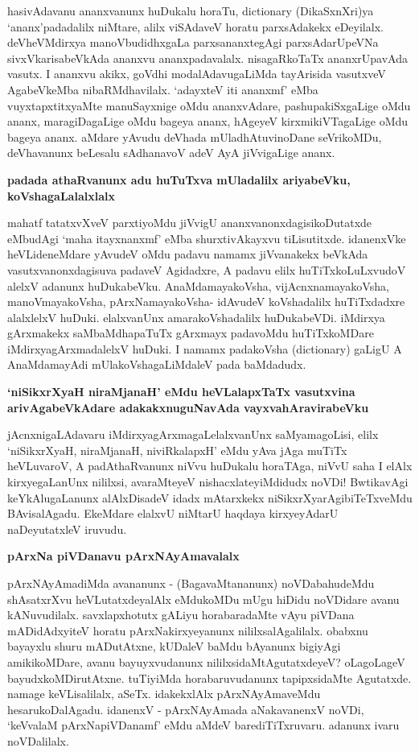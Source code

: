 \noindent
hasivAdavanu ananxvanunx huDukalu horaTu, {\rm dictionary} (DikaSxnXri)ya `ananx'padadalilx niMtare, alilx viSAdaveV horatu parxsAdakekx eDeyilalx. deVheVMdirxya manoVbudidhxgaLa parxsananxtegAgi parxsAdarUpeVNa sivxVkarisabeVkAda ananxvu ananxpadavalalx. nisagaRkoTaTx ananxrUpavAda vasutx. I ananxvu akikx, goVdhi modalAdavugaLiMda tayArisida vasutxveV AgabeVkeMba nibaRMdhavilalx. `adayxteV iti ananxmf' eMba vuyxtapxtitxyaMte manuSayxnige oMdu ananxvAdare, pashupakiSxgaLige oMdu ananx, maragiDagaLige oMdu bageya ananx, hAgeyeV kirxmikiVTagaLige oMdu bageya ananx. aMdare yAvudu deVhada mUladhAtuvinoDane seVrikoMDu, deVhavanunx beLesalu sAdhanavoV adeV AyA jiVvigaLige ananx.

{\bigskip
\noindent
{\large\bf padada athaRvanunx adu huTuTxva mUladalilx ariyabeVku, koVshagaLalalxlalx}}
\medskip

\noindent
mahatf tatatxvXveV parxtiyoMdu jiVvigU ananxvanonxdagisikoDutatxde eMbudAgi `maha itayxnanxmf' eMba shurxtivAkayxvu tiLisutitxde. idanenxVke heVLideneMdare yAvudeV oMdu padavu namamx jiVvanakekx beVkAda vasutxvanonxdagisuva padaveV Agidadxre, A padavu elilx huTiTxkoLuLxvudoV alelxV adanunx huDukabeVku. AnaMdamayakoVsha, vijAcnxnamayakoVsha, manoVmayakoVsha, pArxNamayakoVsha- idAvudeV koVshadalilx huTiTxdadxre alalxlelxV huDuki. elalxvanUnx amarakoVshadalilx huDukabeVDi. iMdirxya gArxmakekx saMbaMdhapaTuTx gArxmayx padavoMdu huTiTxkoMDare iMdirxyagArxmadalelxV huDuki. I namamx padakoVsha {\rm (dictionary)} gaLigU A AnaMdamayAdi mUlakoVshagaLiMdaleV pada baMdadudx.

{\bigskip
\noindent
{\large\bf `niSikxrXyaH niraMjanaH' eMdu heVLalapxTaTx vasutxvina arivAgabeVkAdare adakakxnuguNavAda vayxvahAravirabeVku}}
\medskip

\noindent
jAcnxnigaLAdavaru iMdirxyagArxmagaLelalxvanUnx saMyamagoLisi, elilx `niSikxrXyaH, niraMjanaH, niviRkalapxH' eMdu yAva jAga muTiTx heVLuvaroV, A padAthaRvanunx niVvu huDukalu horaTAga, niVvU saha I elAlx kirxyegaLanUnx nililxsi, avaraMteyeV nishacxlateyiMdidudx noVDi! BwtikavAgi keYkAlugaLanunx alAlxDisadeV idadx mAtarxkekx niSikxrXyarAgibiTeTxveMdu BAvisalAgadu. EkeMdare elalxvU niMtarU haqdaya kirxyeyAdarU naDeyutatxleV iruvudu.

\newpage
{\noindent
{\large\bf pArxNa piVDanavu pArxNAyAmavalalx}}\label{page202}
\medskip

\noindent
pArxNAyAmadiMda avananunx - (BagavaMtananunx) noVDabahudeMdu shAsatxrXvu heVLutatxdeyalAlx eMdukoMDu mUgu hiDidu noVDidare avanu kANuvudilalx. savxlapxhotutx gALiyu horabaradaMte vAyu piVDana mADidAdxyiteV horatu pArxNakirxyeyanunx nililxsalAgalilalx. obabxnu bayayxlu shuru mADutAtxne, kUDaleV baMdu \hbox{bAyanunx} bigiyAgi amikikoMDare, avanu bayuyxvudanunx nililxsidaMtAgutatxdeyeV? oLagoLageV bayudxkoMDirutAtxne. tuTiyiMda horabaruvudanunx tapipxsidaMte Agutatxde. namage keVLisalilalx, aSeTx. idakekxlAlx pArxNAyAmaveMdu hesarukoDalAgadu. idanenxV - pArxNAyAmada aNakavanenxV noVDi, `keVvalaM pArxNapiVDanamf' eMdu aMdeV barediTiTxruvaru. adanunx ivaru noVDalilalx.

